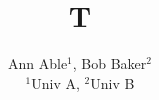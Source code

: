 \documentclass{article}
\begin{document}
\title{T}
\author{Ann Able$^{1}$, Bob Baker$^{2}$ \\ {\small \vspace{1mm} $^{1}$Univ A, $^{2}$Univ B}}
\maketitle
\end{document}
